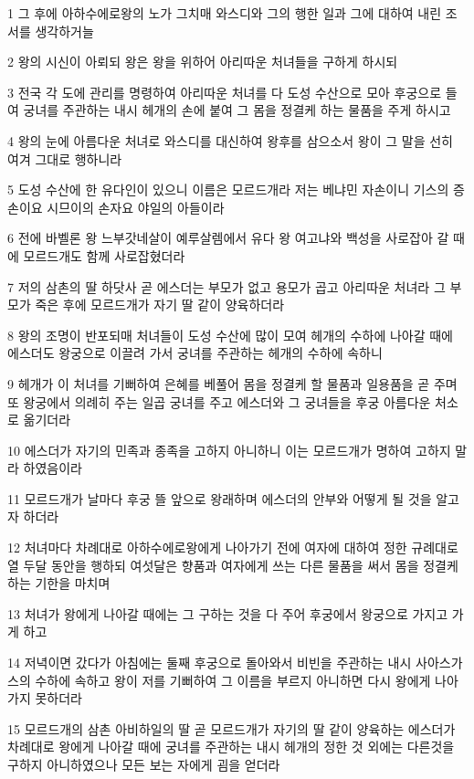 \par 1 그 후에 아하수에로왕의 노가 그치매 와스디와 그의 행한 일과 그에 대하여 내린 조서를 생각하거늘
\par 2 왕의 시신이 아뢰되 왕은 왕을 위하어 아리따운 처녀들을 구하게 하시되
\par 3 전국 각 도에 관리를 명령하여 아리따운 처녀를 다 도성 수산으로 모아 후궁으로 들여 궁녀를 주관하는 내시 헤개의 손에 붙여 그 몸을 정결케 하는 물품을 주게 하시고
\par 4 왕의 눈에 아름다운 처녀로 와스디를 대신하여 왕후를 삼으소서 왕이 그 말을 선히 여겨 그대로 행하니라
\par 5 도성 수산에 한 유다인이 있으니 이름은 모르드개라 저는 베냐민 자손이니 기스의 증손이요 시므이의 손자요 야일의 아들이라
\par 6 전에 바벨론 왕 느부갓네살이 예루살렘에서 유다 왕 여고냐와 백성을 사로잡아 갈 때에 모르드개도 함께 사로잡혔더라
\par 7 저의 삼촌의 딸 하닷사 곧 에스더는 부모가 없고 용모가 곱고 아리따운 처녀라 그 부모가 죽은 후에 모르드개가 자기 딸 같이 양육하더라
\par 8 왕의 조명이 반포되매 처녀들이 도성 수산에 많이 모여 헤개의 수하에 나아갈 때에 에스더도 왕궁으로 이끌려 가서 궁녀를 주관하는 헤개의 수하에 속하니
\par 9 헤개가 이 처녀를 기뻐하여 은혜를 베풀어 몸을 정결케 할 물품과 일용품을 곧 주며 또 왕궁에서 의례히 주는 일곱 궁녀를 주고 에스더와 그 궁녀들을 후궁 아름다운 처소로 옮기더라
\par 10 에스더가 자기의 민족과 종족을 고하지 아니하니 이는 모르드개가 명하여 고하지 말라 하였음이라
\par 11 모르드개가 날마다 후궁 뜰 앞으로 왕래하며 에스더의 안부와 어떻게 될 것을 알고자 하더라
\par 12 처녀마다 차례대로 아하수에로왕에게 나아가기 전에 여자에 대하여 정한 규례대로 열 두달 동안을 행하되 여섯달은 향품과 여자에게 쓰는 다른 물품을 써서 몸을 정결케 하는 기한을 마치며
\par 13 처녀가 왕에게 나아갈 때에는 그 구하는 것을 다 주어 후궁에서 왕궁으로 가지고 가게 하고
\par 14 저녁이면 갔다가 아침에는 둘째 후궁으로 돌아와서 비빈을 주관하는 내시 사아스가스의 수하에 속하고 왕이 저를 기뻐하여 그 이름을 부르지 아니하면 다시 왕에게 나아가지 못하더라
\par 15 모르드개의 삼촌 아비하일의 딸 곧 모르드개가 자기의 딸 같이 양육하는 에스더가 차례대로 왕에게 나아갈 때에 궁녀를 주관하는 내시 헤개의 정한 것 외에는 다른것을 구하지 아니하였으나 모든 보는 자에게 굄을 얻더라
